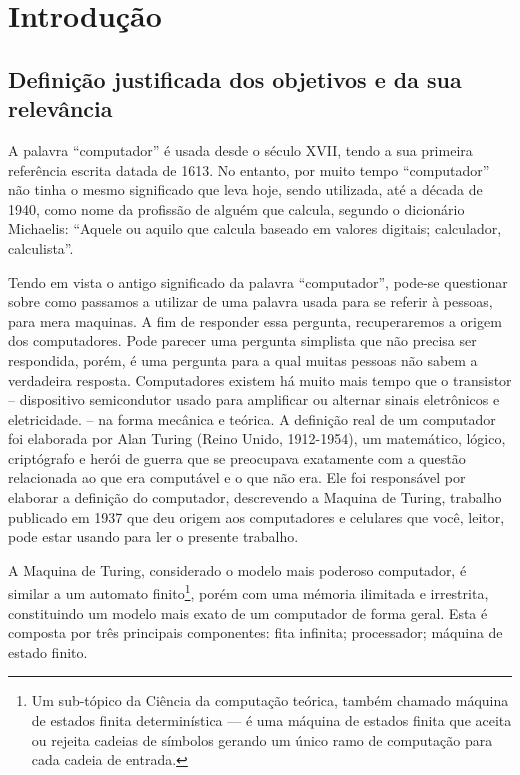 \section{Introdução} 
\subsection{Definição justificada dos objetivos e da sua relevância}
A palavra “computador” é usada desde o século XVII, tendo a sua primeira referência escrita datada de 1613. No entanto, por muito tempo “computador” não tinha o mesmo significado que leva hoje, sendo utilizada, até a década de 1940, como nome da profissão de alguém que calcula, segundo o dicionário Michaelis: “Aquele ou aquilo que calcula baseado em valores digitais; calculador, calculista”. \cite{4}

Tendo em vista o antigo significado da palavra “computador”, pode-se questionar sobre como passamos a utilizar de uma palavra usada para se referir à pessoas, para mera maquinas. A fim de responder essa pergunta, recuperaremos a origem dos computadores. Pode parecer uma pergunta simplista que não precisa ser respondida, porém, é uma pergunta para a qual muitas pessoas não sabem a verdadeira resposta. Computadores existem há muito mais tempo que o transistor – dispositivo semicondutor usado para amplificar ou alternar sinais eletrônicos e eletricidade. – na forma mecânica e teórica. A definição real de um computador foi elaborada por Alan Turing (Reino Unido, 1912-1954), um matemático, lógico, criptógrafo e herói de guerra que se preocupava exatamente com a questão relacionada ao que era computável e o que não era. Ele foi responsável por elaborar a definição do computador, descrevendo a Maquina de Turing, trabalho publicado em 1937 que deu origem aos computadores e celulares que você, leitor, pode estar usando para ler o presente trabalho.

A Maquina de Turing, considerado o modelo mais poderoso computador, é similar a um automato finito\footnote{Um sub-tópico da Ciência da computação teórica, também chamado máquina de estados finita determinística — é uma máquina de estados finita que aceita ou rejeita cadeias de símbolos gerando um único ramo de computação para cada cadeia de entrada.}, porém com uma mémoria ilimitada e irrestrita, constituindo um modelo mais exato de um computador de forma geral. Esta é composta por três principais componentes: fita infinita; processador; máquina de estado finito. 

